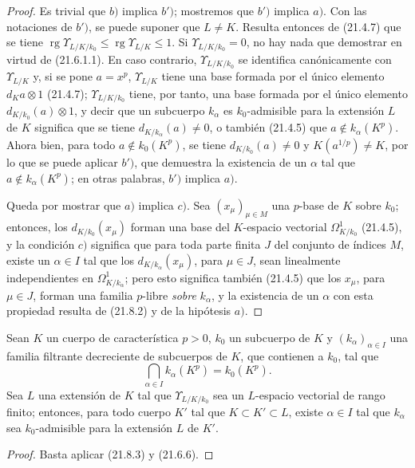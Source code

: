 \begin{proof}
Es trivial que $b)$ implica $b')$; mostremos que $b')$ implica $a)$. Con las
notaciones de $b')$, se puede suponer que $L\ne K$. Resulta entonces de (21.4.7)
que se tiene $\operatorname{rg}\Upsilon_{L/K/k_0}\leqslant\operatorname{rg}\Upsilon_{L/K}\leqslant1$. Si
$\Upsilon_{L/K/k_0}=0$, no hay nada que demostrar en virtud de
(21.6.1.1). En caso contrario, $\Upsilon_{L/K/k_0}$ se identifica
canónicamente con $\Upsilon_{L/K}$ y, si se pone $a=x^p$, $\Upsilon_{L/K}$
tiene una base formada por el único elemento $d_Ka\otimes1$ (21.4.7);
$\Upsilon_{L/K/k_0}$ tiene, por tanto, una base formada por el único
elemento $d_{K/k_0}(a)\otimes1$, y decir que un subcuerpo $k_\alpha$ es
$k_0$-admisible para la extensión $L$ de $K$ significa que se tiene
$d_{K/k_\alpha}(a)\ne0$, o también (21.4.5) que
$a\notin k_\alpha(K^p)$. Ahora bien, para todo $a\notin k_0(K^p)$, se tiene
$d_{K/k_0}(a)\ne0$ y $K(a^{1/p})\ne K$, por lo que se puede aplicar $b')$, que
demuestra la existencia de un $\alpha$ tal que $a\notin k_\alpha(K^p)$; en
otras palabras, $b')$ implica $a)$.

Queda por mostrar que $a)$ implica $c)$. Sea $(x_\mu)_{\mu\in M}$ una
$p$-base de $K$ sobre $k_0$; entonces, los $d_{K/k_0}(x_\mu)$ forman una base
del $K$-espacio vectorial $\Omega^1_{K/k_0}$ (21.4.5), y la condición $c)$
significa que para toda parte finita $J$ del conjunto de índices $M$, existe
un $\alpha\in I$ tal que los $d_{K/k_\alpha}(x_\mu)$, para $\mu\in J$, sean
linealmente independientes en $\Omega^1_{K/k_\alpha}$; pero esto significa
también (21.4.5) que los $x_\mu$, para $\mu\in J$, forman una familia
$p$-libre \emph{sobre} $k_\alpha$, y la existencia de un $\alpha$ con esta propiedad
resulta de (21.8.2) y de la hipótesis $a)$.
\end{proof}

\begin{corollary}[21.8.4]
\label{0.21.8.4-fr}
Sean $K$ un cuerpo de característica $p>0$, $k_0$ un subcuerpo de $K$ y
$(k_\alpha)_{\alpha\in I}$ una familia filtrante decreciente de subcuerpos de
$K$, que contienen a $k_0$, tal que
\[
  \bigcap_{\alpha\in I}k_\alpha(K^p)=k_0(K^p).
\]
Sea $L$ una extensión de $K$ tal que $\Upsilon_{L/K/k_0}$ sea un
$L$-espacio vectorial de rango finito; entonces, para todo cuerpo $K'$ tal que
$K\subset K'\subset L$, existe $\alpha\in I$ tal que $k_\alpha$ sea
$k_0$-admisible para la extensión $L$ de $K'$.
\end{corollary}

\begin{proof}
Basta aplicar (21.8.3) y (21.6.6).
\end{proof}

